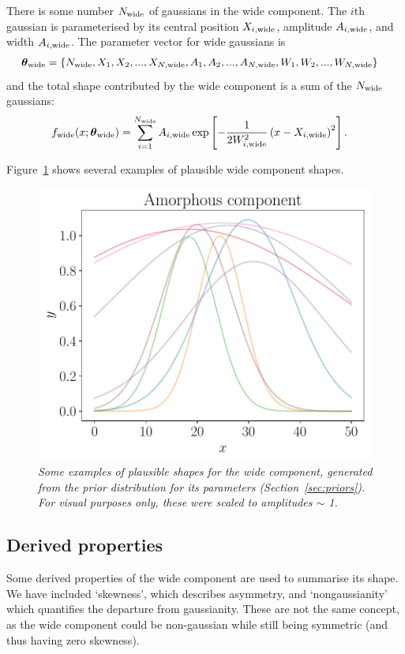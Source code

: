 \documentclass[a4paper, 12pt]{article}
\newcommand{\params}{\boldsymbol{\theta}}
\newcommand{\x}{x}
\begin{document}
There is some number $N_{\rm wide}$ of gaussians in the wide component.
The $i$th gaussian is parameterised
by its central position $X_{i, \rm wide}$,
amplitude $A_{i, \rm wide}$, and width $A_{i, \rm wide}$.
The parameter vector for wide gaussians is
\begin{align}
\params_{\rm wide} &=
  \{N_{\rm wide}, X_1, X_2, ..., X_{N, \rm wide},
    A_1, A_2, ..., A_{N, \rm wide},
    W_1, W_2, ..., W_{N, \rm wide}\}
\end{align}
and the total shape contributed by the
wide component is a sum of the $N_{\rm wide}$ gaussians:
\begin{align}
f_{\rm wide}(\x; \params_{\rm wide}) &=
    \sum_{i=1}^{N_{\rm wide}} A_{i, \rm wide}
 \exp\left[-\frac{1}{2W_{i, \rm wide}^2}\left(x - X_{i, \rm wide}\right)^2\right].
\end{align}

Figure~\ref{fig:wide_component} shows several examples of plausible
wide component shapes.

\begin{figure}[!ht]
\centering
\includegraphics[scale=0.7]{figures/wide_component.pdf}
\caption{\it Some examples of plausible shapes for the wide component,
generated from the prior distribution for its parameters
(Section~\ref{sec:priors}). For visual purposes only, these
were scaled to amplitudes $\sim$ 1. \label{fig:wide_component}}
\end{figure}

\subsection{Derived properties}
Some derived properties of the wide component are used to summarise its shape.
We have included `skewness', which describes asymmetry, and `nongaussianity'
which quantifies the departure from gaussianity. These are not the same
concept, as the wide component could be non-gaussian while still being symmetric
(and thus having zero skewness).
\end{document}

